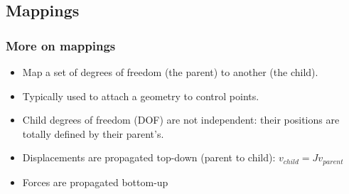 \documentclass[a4paper,compress]{beamer}
\begin{document}
\subsection{Mappings}

\begin{frame}
\frametitle{More on mappings}
\begin{itemize}
 \item Map a set of degrees of freedom (the parent) to another (the child).
 \item Typically used to attach a geometry to control points.
 \item Child degrees of freedom (DOF) are not independent: their positions are totally defined by their parent's.
 \item Displacements are propagated top-down (parent to child): $v_{child} = Jv_{parent}$
 \item Forces are propagated bottom-up
\end{itemize}

\end{frame}
\end{document}

